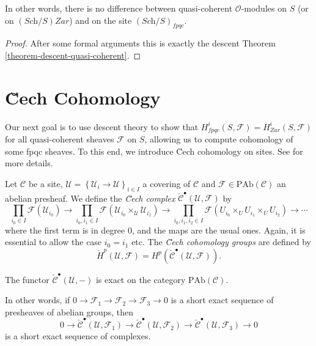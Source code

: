 \noindent
In other words, there is no difference between quasi-coherent 
$\mathcal{O}$-modules on $S$ (or on $(\textit{Sch}/S)Zar$) and on the site 
$(\textit{Sch}/S)_{fpqc}$.
  
\begin{proof} 
After some formal arguments this is exactly the descent Theorem 
\ref{theorem-descent-quasi-coherent}.
\end{proof}





\section{\u Cech Cohomology}
\label{section-cech-cohomology}

\noindent
Our next goal is to use descent theory to show that $H_{fpqc}^i(S, \mathcal{F}) 
= H_{Zar}^i(S, \mathcal{F})$ for all quasi-coherent  sheaves $\mathcal{F}$ on 
$S$, allowing us to compute cohomology of some fpqc sheaves.  To this end, we 
introduce \u Cech cohomology on sites. See \cite{ArtinTopologies} for more 
details.
 
\begin{definition} 
\label{definition-cech-complex}
Let $\mathcal{C}$ be a site, $\mathcal{U}=\left\{\mathcal{U}_i\to 
\mathcal{U}\right\}_{i\in I}$ a covering of $\mathcal{C}$ and $\mathcal{F}\in 
\text{PAb}(\mathcal{C})$ an abelian presheaf. We define the
{\it \u Cech complex}
$\check{\mathcal{C}}^\bullet(\mathcal{U}, \mathcal{F})$ by 
$$ 
 \prod_{i_0\in I}\mathcal{F}(\mathcal{U}_{i_0}) \to \prod_{i_0, 
i_1\in I}\mathcal{F}\left(\mathcal{U}_{i_0}\times_{\mathcal{U}} 
\mathcal{U}_{i_1}\right) \to \prod_{i_0, i_1, i_2 \in I} 
\mathcal{F}\left(U_{i_0}\times_U U_{i_1} \times_U U_{i_2}\right) \to \cdots
$$
where the first term is in degree 0, and the maps are the usual ones. Again, it 
is essential to allow the case $i_0 = i_1$ etc. The
{\it \u Cech cohomology groups} are defined by
$$
\check{H}^p(\mathcal{U}, \mathcal{F})= 
H^p(\check{\mathcal{C}}^\bullet\left(\mathcal{U}, \mathcal{F}\right)).
$$
\end{definition}

\begin{lemma}
\label{lemma-cech-presheaves}
The functor $\check{\mathcal{C}}^\bullet(\mathcal{U}, -)$ is exact on the 
category $\text{PAb}(\mathcal{C})$. 
\end{lemma}	
  
\noindent
In other words, if $0\to \mathcal{F}_1\to \mathcal{F}_2\to \mathcal{F}_3\to 0$ 
is a short exact sequence of presheaves of abelian groups, then  
$$
0 \to \check{\mathcal{C}}^\bullet\left(\mathcal{U}, \mathcal{F}_1\right) 
\to\check{\mathcal{C}}^\bullet(\mathcal{U}, \mathcal{F}_2) \to 
\check{\mathcal{C}}^\bullet(\mathcal{U}, \mathcal{F}_3)\to 0 
$$
is a short exact sequence of complexes.
  
